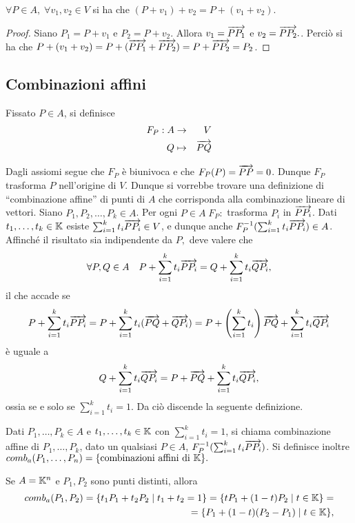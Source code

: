  \begin{lemma}
 $\forall P\in A,\; \forall v_1,v_2\in V$ si ha che $(P+v_1)+v_2=P+(v_1+v_2).$
 \end{lemma}
 
 \begin{proof}
 Siano $P_1=P+v_1$ e $P_2=P+v_2$. Allora $v_1=\overrightarrow{PP_1}$ e
 $v_2=\overrightarrow{PP_2}.$.
 Perciò si ha che $P+(v_1+v_2)=P+(\overrightarrow{PP_1}+\overrightarrow{PP_2})=P+\overrightarrow{PP_2}=P_2$.
 \end{proof}
 
	\subsection{Combinazioni affini}
 
 Fissato $P\in A$, si definisce
 \begin{eqnarray*}
  F_P: A & \to & V \\
  Q & \mapsto & \overrightarrow{PQ}
 \end{eqnarray*}
 
 Dagli assiomi segue che $F_P$ è biunivoca e che $F_P(P)=\overrightarrow{PP}=0$. Dunque $F_P$ trasforma
 $P$ nell'origine di $V$.
 Dunque si vorrebbe trovare una definizione di ``combinazione affine'' di punti di $A$ che corrisponda alla combinazione
 lineare di vettori. Siano $P_1,P_2,\ldots,P_k\in A$. Per ogni $P\in A\; F_P:$ trasforma
 $P_i$ in $\overrightarrow{PP_i}$.
 Dati $t_1,\ldots,t_k\in \mathbb K$ esiste $\sum_{i=1}^kt_i\overrightarrow{PP_i}\in V$, e dunque anche
 $F_P^{-1}(\sum_{i=1}^kt_i\overrightarrow{PP_i})\in A$.
 Affinché il risultato sia indipendente da $P,$ deve valere che
 $$\forall P,Q\in A\quad P+\sum_{i=1}^kt_i\overrightarrow{PP_i}=Q+\sum_{i=1}^kt_i\overrightarrow{QP_i},$$
 il che accade se
 $$P+\sum_{i=1}^kt_i\overrightarrow{PP_i}=P+\sum_{i=1}^kt_i(\overrightarrow{PQ}+\overrightarrow{QP_i})=P+\left(\sum_{i=1}^kt_i\right)\overrightarrow{PQ}+\sum_{i=1}^kt_i\overrightarrow{QP_i}$$
 è uguale a
 $$Q+\sum_{i=1}^kt_i\overrightarrow{QP_i}=P+\overrightarrow{PQ}+\sum_{i=1}^kt_i\overrightarrow{QP_i},$$
 ossia se e solo se $\sum_{i=1}^kt_i=1$.
 Da ciò discende la seguente definizione.
 
 \begin{definition}
 Dati $P_1,\ldots,P_k\in A$ e $t_1,\ldots,t_k\in \mathbb K$ con $\sum_{i=1}^kt_i=1$,
 si chiama combinazione affine di $P_1,\ldots,P_k$, dato un qualsiasi $P\in A$, 
 $F_P^{-1}(\sum_{i=1}^kt_i\overrightarrow{PP_i})$.
 Si definisce inoltre $comb_a(P_1,\ldots,P_n)=\{\text{combinazioni affini di }\mathbb K\}.$
 \end{definition}
 
 \begin{example}
 Se $A=\mathbb K^n$ e $P_1,P_2$ sono punti distinti, allora
 \begin{eqnarray*}
	comb_a(P_1,P_2)=\{t_1P_1+t_2P_2\;|\;t_1+t_2=1\}=\{tP_1+(1-t)P_2\;|\; t\in \mathbb K\}=\\
	=\{P_1+(1-t)(P_2-P_1)\;|\; t\in \mathbb K\},
 \end{eqnarray*}
 \end{example}

